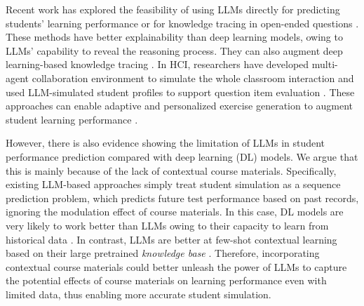 Recent work has explored the feasibility of using LLMs directly for predicting students' learning performance \cite{zhang2024predicting,xu2023leveraging} or for knowledge tracing \cite{yu2024eckt} in open-ended questions \cite{liu2022gpt}. 
%
These methods have better explainability than deep learning models, owing to LLMs' capability to reveal the reasoning process\cite{li2024explainable}.
%
They can also augment deep learning-based knowledge tracing \cite{fu2024sinktstructureawareinductiveknowledge,jung2024clst}.
%
In HCI, researchers have developed multi-agent collaboration environment to simulate the whole classroom interaction \cite{zhang2024simulating,chen2023agentverse} and used LLM-simulated student profiles to support question item evaluation \cite{Lu_2024}. These approaches can enable adaptive and personalized exercise generation to augment student learning performance \cite{cui2023adaptive}.




However, there is also evidence \cite{neshaei2024modelinglearnerperformancelarge} showing the 
limitation of LLMs in student performance prediction compared with deep learning (DL) models. We argue that this is mainly because of the lack of contextual course materials. Specifically, existing LLM-based approaches \cite{fu2024sinktstructureawareinductiveknowledge,jung2024clst,li2024integrating,lee2024monacobert,lee2024language} simply treat student simulation as a sequence prediction problem, which predicts future test performance based on past records, ignoring the modulation effect of course materials. In this case, DL models are very likely to work better than LLMs owing to their capacity to learn from historical data \cite{lecun2015deep, tang2023struc}. In contrast, LLMs are better at few-shot contextual learning based on their large pretrained \textit{knowledge base} \cite{dong2022survey}. Therefore, incorporating contextual course materials could better unleash the power of LLMs to capture the potential effects of course materials on learning performance even with limited data, thus enabling more accurate student simulation.

